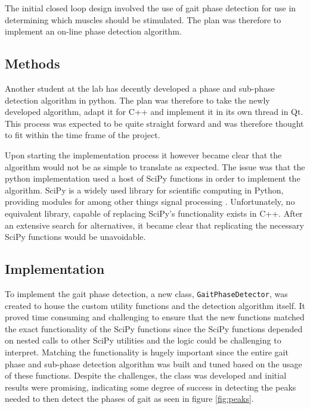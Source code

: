 

The initial closed loop design involved the use of gait phase detection for use in determining which muscles should be stimulated. The plan was therefore to implement an on-line phase detection algorithm.

\subsection{Methods}
Another student at the lab has decently developed a phase and sub-phase detection algorithm in python. The plan was therefore to take the newly developed algorithm, adapt it for C++ and implement it in its own thread in Qt. This process was expected to be quite straight forward and was therefore thought to fit within the time frame of the project.

Upon starting the implementation process it however became clear that the algorithm would not be as simple to translate as expected. The issue was that the python implementation used a host of SciPy \cite{noauthor_scipy_nodate} functions in order to implement the algorithm. SciPy is a  widely used library for scientific computing in Python, providing modules for among other things signal processing \cite{noauthor_scipy_nodate}. Unfortunately, no equivalent library, capable of replacing SciPy's functionality exists in C++. After an extensive search for alternatives, it became clear that replicating the necessary SciPy functions would be unavoidable.

\subsection{Implementation}
To implement the gait phase detection, a new class, \texttt{GaitPhaseDetector}, was created to house the custom utility functions and the detection algorithm itself. It proved time consuming and challenging to ensure that the new functions matched the exact functionality of the SciPy functions since the SciPy functions depended on nested calls to other SciPy utilities and the logic could be challenging to interpret. Matching the functionality is hugely important since the entire gait phase and sub-phase detection algorithm was built and tuned based on the usage of these functions. Despite the challenges, the class was developed and initial results were promising, indicating some degree of success in detecting the peaks needed to then detect the phases of gait as seen in figure \ref{fig:peaks}. 

